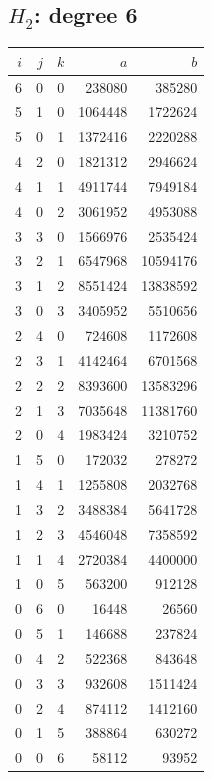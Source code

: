 \subsection{\texorpdfstring{$H_2$}{H2}: degree 6}
\begin{longtable}{rrr|rr}
$i$&$j$&$k$&$a$&$b$\\\hline\endhead
6&0&0&238080&385280\\
5&1&0&1064448&1722624\\
5&0&1&1372416&2220288\\
4&2&0&1821312&2946624\\
4&1&1&4911744&7949184\\
4&0&2&3061952&4953088\\
3&3&0&1566976&2535424\\
3&2&1&6547968&10594176\\
3&1&2&8551424&13838592\\
3&0&3&3405952&5510656\\
2&4&0&724608&1172608\\
2&3&1&4142464&6701568\\
2&2&2&8393600&13583296\\
2&1&3&7035648&11381760\\
2&0&4&1983424&3210752\\
1&5&0&172032&278272\\
1&4&1&1255808&2032768\\
1&3&2&3488384&5641728\\
1&2&3&4546048&7358592\\
1&1&4&2720384&4400000\\
1&0&5&563200&912128\\
0&6&0&16448&26560\\
0&5&1&146688&237824\\
0&4&2&522368&843648\\
0&3&3&932608&1511424\\
0&2&4&874112&1412160\\
0&1&5&388864&630272\\
0&0&6&58112&93952\\
\end{longtable}
